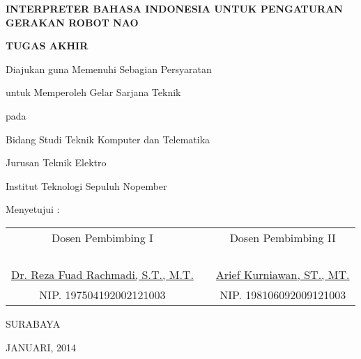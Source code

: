 \begin{center}
\textbf{INTERPRETER BAHASA INDONESIA UNTUK PENGATURAN GERAKAN ROBOT NAO}

\vspace{10ex}

\textbf{TUGAS AKHIR}

\vspace{7ex}

Diajukan guna Memenuhi Sebagian Persyaratan 

untuk Memperoleh Gelar Sarjana Teknik 

pada 

Bidang Studi Teknik Komputer dan Telematika 

Jurusan Teknik Elektro 

Institut Teknologi Sepuluh Nopember 

\vspace{5ex}

Menyetujui :

\vspace{5ex}

\begin{tabular}{c c c}
Dosen Pembimbing I&\hspace{1ex}&Dosen Pembimbing II
\\
\\
\\
\\
\\
\underline{Dr. Reza Fuad Rachmadi, S.T., M.T.}&\hspace{1ex}&\underline{Arief Kurniawan, ST., MT.}
\\
NIP. 197504192002121003&\hspace{1ex}&NIP. 198106092009121003
\end{tabular}

\vspace{23ex}

SURABAYA

JANUARI, 2014

\end{center}